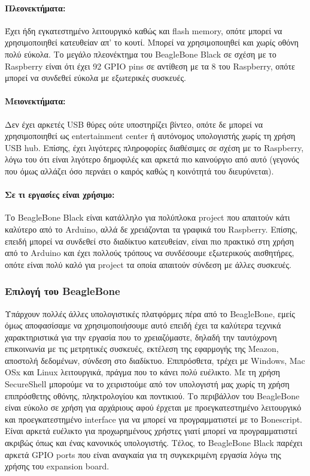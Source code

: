 \documentclass[12pt, a4paper, oneside]{report}
\begin{document}
\paragraph{Πλεονεκτήματα:} Έχει ήδη εγκατεστημένο λειτουργικό καθώς και flash memory, οπότε μπορεί να χρησιμοποιηθεί κατευθείαν απ' το κουτί. Μπορεί να χρησιμοποιηθεί και χωρίς οθόνη πολύ εύκολα. Το μεγάλο πλεονέκτημα του BeagleBone Black σε σχέση με το Raspberry είναι ότι έχει 92 GPIO pins σε αντίθεση με τα 8 του Raspberry, οπότε μπορεί να συνδεθεί εύκολα με εξωτερικές συσκευές.

\paragraph{Μειονεκτήματα:} Δεν έχει αρκετές USB θύρες ούτε υποστηρίζει βίντεο, οπότε δε μπορεί να χρησιμοποιηθεί ως entertainment center ή αυτόνομος υπολογιστής χωρίς τη χρήση USB hub. Επίσης, έχει λιγότερες πληροφορίες διαθέσιμες σε σχέση με το Raspberry, λόγω του ότι είναι λιγότερο δημοφιλές και αρκετά πιο καινούργιο από αυτό (γεγονός που όμως αλλάζει όσο περνάει ο καιρός καθώς η κοινότητά του διευρύνεται).

\paragraph{Σε τι εργασίες είναι χρήσιμο:} Το BeagleBone Black είναι κατάλληλο για πολύπλοκα project που απαιτούν κάτι καλύτερο από το Arduino, αλλά δε χρειάζονται τα γραφικά του Raspberry. Επίσης, επειδή μπορεί να συνδεθεί στο διαδίκτυο κατευθείαν, είναι πιο πρακτικό στη χρήση από το Arduino και έχει πολλούς τρόπους να συνδέσουμε εξωτερικούς αισθητήρες, οπότε είναι πολύ καλό για project τα οποία απαιτούν σύνδεση με άλλες συσκευές.

\subsubsection{Επιλογή του BeagleBone}

Υπάρχουν πολλές άλλες υπολογιστικές πλατφόρμες πέρα από το BeagleBone, εμείς όμως αποφασίσαμε να χρησιμοποιήσουμε αυτό επειδή έχει τα καλύτερα τεχνικά χαρακτηριστικά για την εργασία που το χρειαζόμαστε, δηλαδή την ταυτόχρονη επικοινωνία με τις μετρητικές συσκευές, εκτέλεση της εφαρμογής της Meazon, αποστολή δεδομένων, σύνδεση στο διαδίκτυο. Επιπρόσθετα, τρέχει με Windows, Mac OSx και Linux λειτουργικά, πράγμα που το κάνει πολύ ευέλικτο. Με τη χρήση SecureShell μπορούμε να το χειριστούμε από τον υπολογιστή μας χωρίς τη χρήση επιπρόσθετης οθόνης, πληκτρολογίου και ποντικιού. Το περιβάλλον του BeagleBone είναι εύκολο σε χρήση για αρχάριους αφού έρχεται με προεγκατεστημένο λειτουργικό και προεγκατεστημένο interface για να μπορεί να προγραμματιστεί με το Bonescript. Είναι αρκετά ευέλικτο για προχωρημένους χρήστες γιατί μπορεί να προγραμματιστεί ακριβώς όπως και ένας κανονικός υπολογιστής. Τέλος, το BeagleBone Black παρέχει αρκετά GPIO ports που είναι αναγκαία για τη συγκεκριμένη εργασία λόγω της χρήσης του expansion board.
\end{document}
